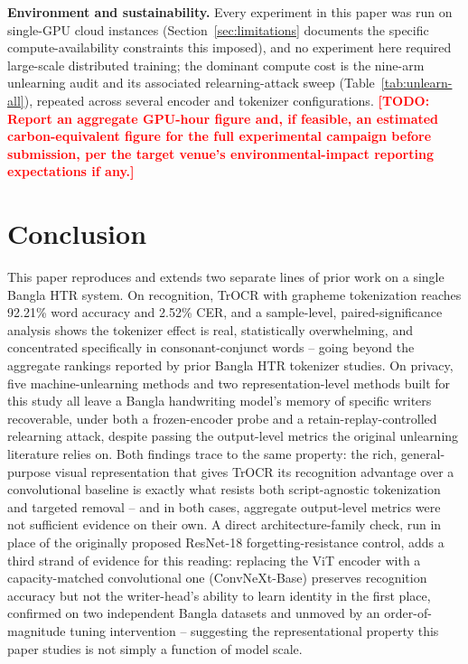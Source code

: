 \documentclass[a4paper,fleqn]{cas-dc}
\newcommand{\todo}[1]{\textcolor{red}{\textbf{[TODO: #1]}}}
\begin{document}
\textbf{Environment and sustainability.} Every experiment in this paper
was run on single-GPU cloud instances (Section~\ref{sec:limitations}
documents the specific compute-availability constraints this imposed),
and no experiment here required large-scale distributed training; the
dominant compute cost is the nine-arm unlearning audit and its associated
relearning-attack sweep (Table~\ref{tab:unlearn-all}), repeated across
several encoder and tokenizer configurations. \todo{Report an aggregate
GPU-hour figure and, if feasible, an estimated carbon-equivalent figure
for the full experimental campaign before submission, per the target
venue's environmental-impact reporting expectations if any.}

\section{Conclusion}
\label{sec:conclusion}

This paper reproduces and extends two separate lines of prior work on a
single Bangla HTR system. On recognition, TrOCR with grapheme tokenization
reaches 92.21\% word accuracy and 2.52\% CER, and a sample-level,
paired-significance analysis shows the tokenizer effect is real,
statistically overwhelming, and concentrated specifically in
consonant-conjunct words -- going beyond the aggregate rankings reported by
prior Bangla HTR tokenizer studies. On privacy, five machine-unlearning
methods and two representation-level methods built for this study all
leave a Bangla handwriting model's memory of specific writers
recoverable, under both a frozen-encoder probe and a retain-replay-controlled
relearning attack, despite passing the output-level metrics the original
unlearning literature relies on. Both findings trace to the same property:
the rich, general-purpose visual representation that gives TrOCR its
recognition advantage over a convolutional baseline is exactly what
resists both script-agnostic tokenization and targeted removal --
and in both cases, aggregate output-level metrics were not sufficient
evidence on their own. A direct architecture-family check, run in place
of the originally proposed ResNet-18 forgetting-resistance control, adds a
third strand of evidence for this reading: replacing the ViT encoder with
a capacity-matched convolutional one (ConvNeXt-Base) preserves recognition
accuracy but not the writer-head's ability to learn identity in the first
place, confirmed on two independent Bangla datasets and unmoved by an
order-of-magnitude tuning intervention -- suggesting the representational
property this paper studies is not simply a function of model scale.
\end{document}
